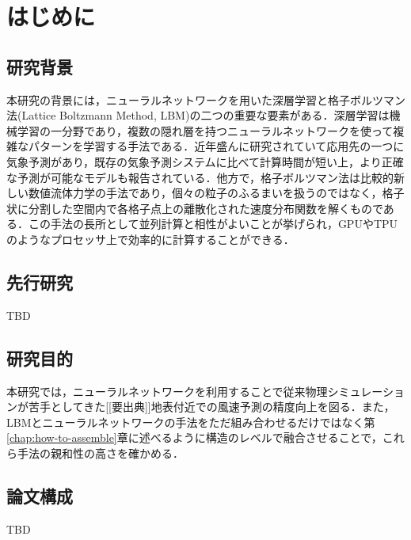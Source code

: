 \chapter{はじめに}

\section{研究背景}
本研究の背景には，ニューラルネットワークを用いた深層学習と格子ボルツマン法(Lattice Boltzmann Method, LBM)の二つの重要な要素がある．深層学習は機械学習の一分野であり，複数の隠れ層を持つニューラルネットワークを使って複雑なパターンを学習する手法である．近年盛んに研究されていて応用先の一つに気象予測があり\cite{Schultz2021}，既存の気象予測システムに比べて計算時間が短い上，より正確な予測が可能なモデルも報告されている\cite{Google2023}．他方で，格子ボルツマン法は比較的新しい数値流体力学の手法であり，個々の粒子のふるまいを扱うのではなく，格子状に分割した空間内で各格子点上の離散化された速度分布関数を解くものである\cite{doi:10.1146/annurev.fluid.30.1.329}．この手法の長所として並列計算と相性がよいことが挙げられ，GPUやTPUのようなプロセッサ上で効率的に計算することができる．

\section{先行研究}
TBD

\section{研究目的}
本研究では，ニューラルネットワークを利用することで従来物理シミュレーションが苦手としてきた[[要出典]]地表付近での風速予測の精度向上を図る．また，LBMとニューラルネットワークの手法をただ組み合わせるだけではなく第\ref{chap:how-to-assemble}章に述べるように構造のレベルで融合させることで，これら手法の親和性の高さを確かめる．

\section{論文構成}
TBD 